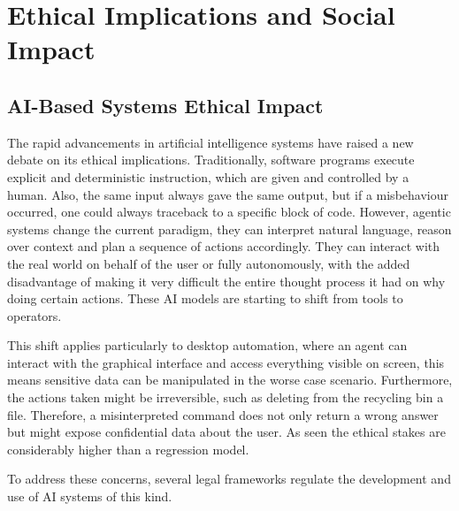\chapter{Ethical Implications and Social Impact}
\setcounter{section}{0}
\setlength{\parindent}{0pt}
\section{AI-Based Systems Ethical Impact}

The rapid advancements in artificial intelligence systems have raised a new debate
on its ethical implications. Traditionally, software programs execute explicit and
deterministic instruction, which are given and controlled by a human. Also, the same
input always gave the same output, but if a misbehaviour occurred, one could always
traceback to a specific block of code. However, agentic systems change the current
paradigm, they can interpret natural language, reason over context and plan a sequence
of actions accordingly. They can interact with the real world on behalf of the user
or fully autonomously, with the added disadvantage of making it very difficult the
entire thought process it had on why doing certain actions. These AI models are
starting to shift from tools to operators.

This shift applies particularly to desktop automation, where an agent can interact
with the graphical interface and access everything visible on screen, this means
sensitive data can be manipulated in the worse case scenario. Furthermore, the actions
taken might be irreversible, such as deleting from the recycling bin a file. Therefore,
a misinterpreted command does not only return a wrong answer but might expose
confidential data about the user. As seen the ethical stakes are considerably higher
than a regression model.

To address these concerns, several legal frameworks regulate the development and
use of AI systems of this kind.

